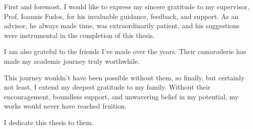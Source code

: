 First and foremost, I would like to express my sincere gratitude to my supervisor, Prof, Ioannis Fudos, for his invaluable  guidance, feedback, and support. As an advisor, he always made time, was extraordinarily patient, and his suggestions were instrumental in the completion of this thesis.

I am also grateful to the friends I've made over the years. Their camaraderie has made my academic journey truly worthwhile.

This journey wouldn't have been possible without them, so finally, but certainly not least, I extend my deepest gratitude to my family. Without their encouragement, boundless support, and unwavering belief in my potential, my works would never have reached fruition. \newline

I dedicate this thesis to them.